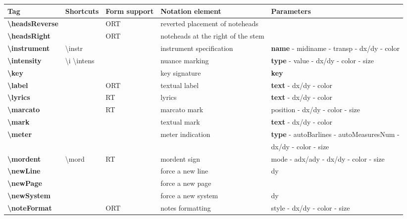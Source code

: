 \documentclass[a4paper, landscape, 10pt]{article}
\begin{document}
\begin{tabularx}{\linewidth}{p{3cm}p{4.5cm}p{3cm}p{5.5cm}l}
    \hline
    \textbf{Tag}&\textbf{Shortcuts}&\textbf{Form support}&\textbf{Notation element}&\textbf{Parameters}\\
    \hline
    \textbf{\textbackslash{}headsReverse}&&ORT&reverted placement of noteheads&\\
    \hline
    \textbf{\textbackslash{}headsRight}&&ORT&noteheads at the right of the stem&\\
    \hline
    \textbf{\textbackslash{}instrument}&\textbackslash{}instr&&instrument specification&\textbf{name} - midiname - transp - dx/dy - color\\
    \hline
    \textbf{\textbackslash{}intensity}&\textbackslash{}i \textbackslash{}intens&&nuance marking&\textbf{type} - value - dx/dy - color - size\\
    \hline
    \textbf{\textbackslash{}key}&&&key signature&\textbf{key}\\
    \hline
    \textbf{\textbackslash{}label}&&ORT&textual label&\textbf{text} - dx/dy - color\\
    \hline
    \textbf{\textbackslash{}lyrics}&&RT&lyrics&\textbf{text} - dx/dy - color\\
    \hline
    \textbf{\textbackslash{}marcato}&&RT&marcato mark&position - dx/dy - color - size\\
    \hline
    \textbf{\textbackslash{}mark}&&&textual mark&\textbf{text} - dx/dy - color\\
    \hline
    \textbf{\textbackslash{}meter}&&&meter indication&\textbf{type} - autoBarlines - autoMeasuresNum - \\
        &&&&dx/dy - color - size\\
    \hline
    \textbf{\textbackslash{}mordent}&\textbackslash{}mord&RT&mordent sign&mode - adx/ady - dx/dy - color - size\\
    \hline
    \textbf{\textbackslash{}newLine}&&&force a new line&dy\\ %
    \hline
    \textbf{\textbackslash{}newPage}&&&force a new page&\\
    \hline
    \textbf{\textbackslash{}newSystem}&&&force a new system&dy\\ %
    \hline
    \textbf{\textbackslash{}noteFormat}&&ORT&notes formatting&style - dx/dy - color - size\\

\end{tabularx}
\end{document}
